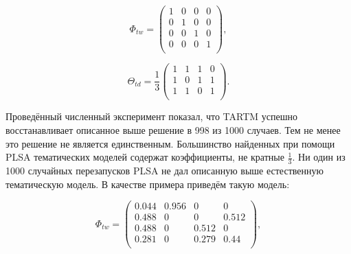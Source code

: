 \begin{minipage}[t]{0.25\textwidth} 

\[ 

\Phi_{tw} =  

\begin{pmatrix} 

    1 & 0 & 0 & 0 \\ 

    0 & 1 & 0 & 0 \\ 

    0 & 0 & 1 & 0 \\ 

    0 & 0 & 0 & 1 \\ 

\end{pmatrix}, 

\] 

\end{minipage}\begin{minipage}[t]{0.2\textwidth} 

\[ 

\Theta_{td} = \frac{1}{3}  

\begin{pmatrix} 

    1 & 1 & 1 & 0 \\ 

    1 & 0 & 1 & 1 \\ 

    1 & 1 & 0 & 1 \\ 

\end{pmatrix}. 

\] 

\end{minipage} 

 

Проведённый численный эксперимент показал, что TARTM успешно восстанавливает описанное выше решение в 998 из 1000 случаев. Тем не менее это решение не является единственным. Большинство найденных при помощи PLSA тематических моделей содержат коэффициенты, не кратные $\frac1{3}$. Ни один из 1000 случайных перезапусков PLSA не дал описанную выше естественную тематическую модель. В качестве примера приведём такую модель: 

\[ 

\Phi_{tw} =  

\begin{pmatrix} 

    0.044 & 0.956 & 0 & 0 \\ 

    0.488 & 0 &  0 & 0.512 \\ 

    0.488 & 0 & 0.512 & 0 \\ 

    0.281 & 0 & 0.279 & 0.44 \\ 

\end{pmatrix}, 

\] 

